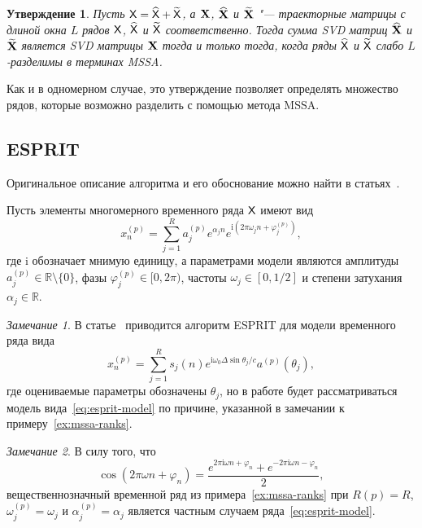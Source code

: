\documentclass[specialist,
  substylefile=spbu_report.rtx,
subf,href,colorlinks=true, 12pt]{disser}
\theoremstyle{plain}
\newtheorem{statement}{Утверждение}[section]
\theoremstyle{definition}
\theoremstyle{remark}
\newtheorem*{remark}{Замечание}
\newcommand{\iu}{\mathrm{i}}
\begin{document}
\begin{statement}
  \label{state:mssa-separability}
  Пусть $\mathsf{X} = \widehat{\mathsf{X}} + \widetilde{\mathsf{X}}$, а $\mathbf{X}$, $\widehat{\mathbf{X}}$ и $\widetilde{\mathbf{X}}$ "--- траекторные
  матрицы с длиной окна $L$ рядов $\mathsf{X}$, $\widehat{\mathsf{X}}$ и $\widetilde{\mathsf{X}}$ соответственно.
  Тогда сумма \emph{SVD} матриц $\widehat{\mathbf{X}}$ и $\widetilde{\mathbf{X}}$ является \emph{SVD} матрицы $\mathbf{X}$ тогда и только тогда, когда
  ряды $\widehat{\mathsf{X}}$ и $\widetilde{\mathsf{X}}$ слабо $L$-разделимы в терминах MSSA.
\end{statement}
Как и в одномерном случае, это утверждение позволяет определять множество рядов, которые возможно разделить с
помощью метода MSSA.

\subsection{ESPRIT}\label{subsec:esprit}
Оригинальное описание алгоритма и его обоснование
можно найти в статьях~\cite{esprit,hosvd-hooi-separation}.

Пусть элементы многомерного временного ряда $\mathsf{X}$ имеют вид
\begin{equation}
  \label{eq:esprit-model}
  x_n^{(p)} = \sum_{j=1}^{R} a_j^{(p)} e^{ \alpha_j n }
  e^{\iu \left( 2 \pi \omega_j n + \varphi_j^{(p)}\right)},
\end{equation}
где $\iu$ обозначает мнимую единицу, а параметрами модели являются амплитуды
$a_j^{(p)} \in \mathbb{R}\setminus\{0\}$, фазы ${\varphi_j^{(p)} \in [0, 2\pi)}$,
частоты $\omega_j\in [0, 1/2]$ и степени затухания $\alpha_j \in \mathbb{R}$.

\begin{remark}
  В статье~\cite{esprit} приводится алгоритм ESPRIT для модели временного ряда вида
  \[
    x_n^{(p)} = \sum_{j=1}^{R} s_j(n)e^{\iu \omega_0 \Delta \sin\theta_j / c} a^{(p)}(\theta_j),
  \]
  где оцениваемые параметры обозначены $\theta_j$,
  но в работе будет рассматриваться модель вида~\eqref{eq:esprit-model} по причине,
  указанной в замечании к примеру~\ref{ex:mssa-ranks}.
\end{remark}
\begin{remark}
  В силу того, что
  \[
    \cos(2 \pi \omega n + \varphi_n) =
    \frac{e^{2\pi \iu \omega n + \varphi_n} + e^{-2\pi \iu \omega n - \varphi_n}}{2},
  \]
  вещественнозначный временной ряд из примера~\ref{ex:mssa-ranks} при
  $R(p)=R$, $\omega_j^{(p)}=\omega_j$ и $\alpha_j^{(p)}=\alpha_j$ является частным случаем
  ряда~\eqref{eq:esprit-model}.
\end{remark}
\end{document}
